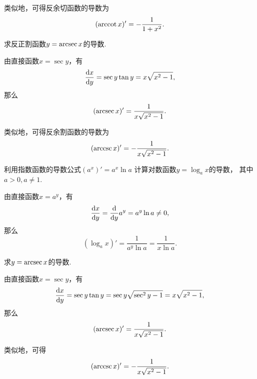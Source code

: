 类似地，可得反余切函数的导数为\begin{equation*}
	(\arccot x)' = -\frac1{1+x^2}.
\end{equation*}

\begin{example}
求反正割函数\(y=\arcsec x\)的导数.
\begin{solution}
由直接函数\(x=\sec y\)，有\begin{equation*}
	\dv{x}{y}
	= \sec y \tan y
	= x \sqrt{x^2-1},
\end{equation*}
那么\begin{equation*}
	(\arcsec x)' = \frac1{x \sqrt{x^2-1}}.
\end{equation*}
\end{solution}
\end{example}

类似地，可得反余割函数的导数为\begin{equation*}
	(\arccsc x)' = -\frac1{x \sqrt{x^2-1}}.
\end{equation*}

\begin{example}
利用指数函数的导数公式\((a^x)' = a^x \ln a\)
计算对数函数\(y=\log_a x\)的导数，
其中\(a>0,a\neq1\).
\begin{solution}
由直接函数\(x=a^y\)，有\begin{equation*}
	\dv{x}{y} = \dv{y} a^y = a^y \ln a \neq 0,
\end{equation*}
那么\begin{equation*}
	(\log_a x)' = \frac1{a^y \ln a} = \frac1{x \ln a}.
\end{equation*}
\end{solution}
\end{example}

\begin{example}
求\(y = \arcsec x\)的导数.
\begin{solution}
由直接函数\(x=\sec y\)，有\begin{equation*}
	\dv{x}{y}
	= \sec y \tan y
	= \sec y \sqrt{\sec^2 y-1}
	= x \sqrt{x^2-1},
\end{equation*}
那么\begin{equation*}
	(\arcsec x)'
	= \frac1{x \sqrt{x^2-1}}.
\end{equation*}
\end{solution}
\end{example}

类似地，可得\begin{equation*}
	(\arccsc x)'
	= -\frac1{x \sqrt{x^2-1}}.
\end{equation*}

